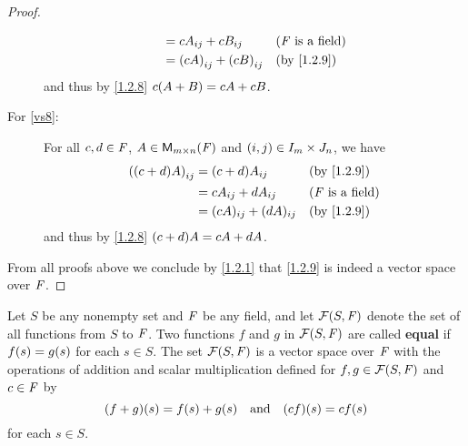 \begin{proof}
\begin{description}
\begin{align*}
				                      & = c A_{i j} + c B_{i j}       &  & \text{(\(\F\) is a field)} \\
				                      & = \p{cA}_{i j} + \p{cB}_{i j} &  & \text{(by \cref{1.2.9})}
			\end{align*}
			and thus by \cref{1.2.8} \(c \p{A + B} = cA + cB\).
		\item[For \ref{vs8}:]
			For all \(c, d \in \mathit{F}\), \(A \in \mathsf{M}_{{m} \times n}({\mathit{F}})\) and \(\left\lparen i, j\right\rparen \in I_{m} \times J_{n}\), we have
			\begin{align*}
				\p{\p{c + d} A}_{i j} & = \p{c + d} A_{i j}       &  & \text{(by \cref{1.2.9})}   \\
				                      & = c A_{i j} + d A_{i j}   &  & \text{(\(\F\) is a field)} \\
				                      & = (cA)_{i j} + (dA)_{i j} &  & \text{(by \cref{1.2.9})}
			\end{align*}
			and thus by \cref{1.2.8} \(\p{c + d} A = cA + dA\).
	\end{description}
	From all proofs above we conclude by \cref{1.2.1} that \cref{1.2.9} is indeed a vector space over \(\mathit{F}\).
\end{proof}

\begin{eg}\label{1.2.10}
	Let \(S\) be any nonempty set and \(\mathit{F}\) be any field, and let \(\FS\) denote the set of all functions from \(S\) to \(\mathit{F}\).
	Two functions \(f\) and \(g\) in \(\FS\) are called \textbf{equal} if \(f\p{s} = g\p{s}\) for each \(s \in S\).
	The set \(\FS\) is a vector space over \(\mathit{F}\) with the operations of addition and scalar multiplication defined for \(f, g \in \FS\) and \(c \in \mathit{F}\) by
	\[
		\p{f + g}\p{s} = f\p{s} + g\p{s} \quad \text{and} \quad \p{cf}\p{s} = cf\p{s}
	\]
	for each \(s \in S\).
\end{eg}

